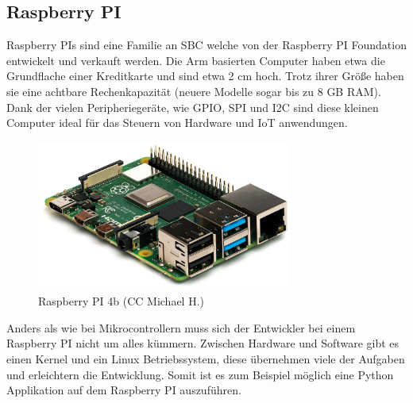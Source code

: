 ﻿\subsection{Raspberry PI}

Raspberry PIs sind eine Familie an \ac{SBC} welche von der Raspberry PI Foundation entwickelt und verkauft werden. Die \ac{Arm} basierten Computer haben etwa die Grundflache einer Kreditkarte und sind etwa 2 cm hoch. Trotz ihrer Größe haben sie eine achtbare Rechenkapazität (neuere Modelle sogar bis zu 8 GB \ac{RAM}\cite{raspberry_pi_4b}). Dank der vielen Peripheriegeräte, wie \ac{GPIO}, \ac{SPI} und \ac{I2C} sind diese kleinen Computer ideal für das Steuern von Hardware und \ac{IoT} anwendungen.

\begin{figure}[h]
  \centering
  \includegraphics[width=0.75\textwidth]{images/raspberry_pi_4b}
  \caption{Raspberry PI 4b (CC Michael H.)}
  \label{fig:raspberry_pi_4b}
\end{figure}

Anders als wie bei Mikrocontrollern muss sich der Entwickler bei einem Raspberry PI nicht um alles kümmern. Zwischen Hardware und Software gibt es einen Kernel und ein Linux Betriebssystem, diese übernehmen viele der Aufgaben und erleichtern die Entwicklung. Somit ist es zum Beispiel möglich eine Python Applikation auf dem Raspberry PI auszuführen.

